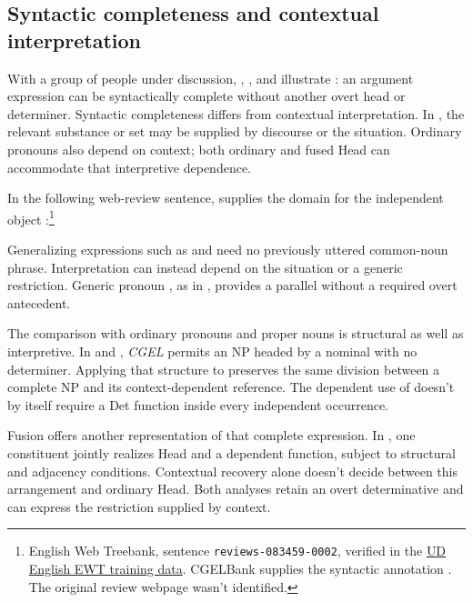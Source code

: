 \documentclass[12pt]{article}
\begin{document}
\subsection{Syntactic completeness and contextual interpretation}\label{sec:saturation}

With a group of people under discussion, , , and  illustrate : an argument expression can be syntactically complete without another overt head or determiner. Syntactic completeness differs from contextual interpretation. In , the relevant substance or set may be supplied by discourse or the situation. Ordinary pronouns also depend on context; both ordinary and fused Head can accommodate that interpretive dependence.

In the following web-review sentence,  supplies the domain for the independent object :\footnote{English Web Treebank, sentence \nolinkurl{reviews-083459-0002}, verified in the \href{https://github.com/UniversalDependencies/UD_English-EWT/blob/master/en_ewt-ud-train.conllu}{UD English EWT training data}. CGELBank supplies the syntactic annotation \citep{reynolds2023unified}. The original review webpage wasn't identified.}

\ea\label{ex:attested-both}
\z

Generalizing expressions such as  and  need no previously uttered common-noun phrase. Interpretation can instead depend on the situation or a generic restriction. Generic pronoun , as in , provides a parallel without a required overt antecedent.

The comparison with ordinary pronouns and proper nouns is structural as well as interpretive. In  and , \textit{CGEL} permits an NP headed by a nominal with no determiner. Applying that structure to  preserves the same division between a complete NP and its context-dependent reference. The dependent use of  doesn't by itself require a Det function inside every independent occurrence.

Fusion offers another representation of that complete expression. In \textcite{Payne2007}, one constituent jointly realizes Head and a dependent function, subject to structural and adjacency conditions. Contextual recovery alone doesn't decide between this arrangement and ordinary Head. Both analyses retain an overt determinative and can express the restriction supplied by context.
\end{document}
